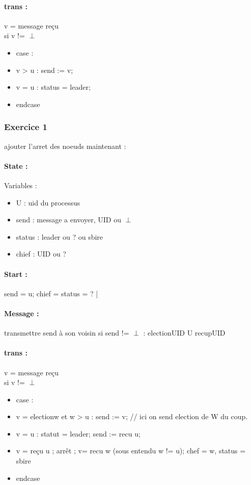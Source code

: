 \documentclass{article}
\begin{document}
\paragraph{trans : } v = message reçu\\si v != $\perp$ \begin{itemize}
\item case : 
\item v > u : send := v;
\item v = u : status = leader;
\item endcase
\end{itemize}

\subsubsection{Exercice 1} ajouter l'arret des noeuds maintenant :  
\paragraph{State : }Variables : 
\begin{itemize}
\item U : uid du processus
\item send : message a envoyer, UID ou $\perp$
\item status  : {leader ou ? ou sbire}
\item chief : UID ou ?
\end{itemize}
\paragraph{Start : } send = u; chief = status = ?
|\paragraph{Message : } transmettre send à son voisin si send != $\perp$ : {electionUID} U {recupUID}
\paragraph{trans : } v = message reçu\\si v != $\perp$ \begin{itemize}
\item case : 
\item v = electionw et w > u : send := v; // ici on send election de W du coup.
\item v = u : statut = leader; send := recu u;
\item v = reçu u ; arrêt ;
v= recu w (sous entendu w != u); chef = w, status = sbire
\item endcase
\end{itemize}
\end{document}
